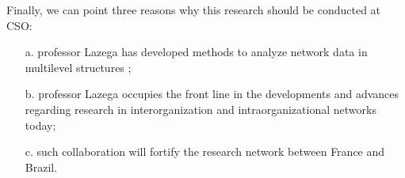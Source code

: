 \documentclass[a4paper, 12pt, openright, oneside, german, french, brazil, english, article]{abntex2}
\begin{document}
	Finally, we can point three reasons why this research should be conducted at CSO:
	
	\begin{enumerate}
		\item[a.] professor Lazega has developed methods to analyze network data in multilevel structures \cite{lazega2016multilevel};
		\item[b.] professor Lazega occupies the front line in the developments and advances regarding research in interorganization and intraorganizational networks today;
		\item[c.] such collaboration will fortify the research network between France and Brazil.
	\end{enumerate}
	
	
	
	
	
	
	
	
	
	
\postextual
{}

\end{document}
